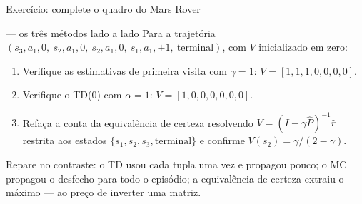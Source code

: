 \documentclass[aspectratio=169, 11pt]{beamer}
\begin{document}
\begin{frame}{Exercício: complete o quadro do Mars Rover}
  \begin{exbox}{— os três métodos lado a lado}
    Para a trajetória
    $(s_3, a_1, 0,\ s_2, a_1, 0,\ s_2, a_1, 0,\ s_1, a_1, +1,\ \text{terminal})$,
    com $V$ inicializado em zero:
    \begin{enumerate}\setlength{\itemsep}{0.15ex}
      \item Verifique as estimativas de primeira visita com $\gamma = 1$:
        $V = [1, 1, 1, 0, 0, 0, 0]$.
      \item Verifique o TD(0) com $\alpha = 1$:
        $V = [1, 0, 0, 0, 0, 0, 0]$.
      \item Refaça a conta da equivalência de certeza resolvendo
        $V = (I - \gamma \hat{P})^{-1} \hat{r}$ restrita aos estados
        $\{s_1, s_2, s_3, \text{terminal}\}$ e confirme
        $V(s_2) = \gamma/(2-\gamma)$.
    \end{enumerate}
  \end{exbox}

  \begin{ideiabox}
    Repare no contraste: o TD usou cada tupla uma vez e propagou pouco;
    o MC propagou o desfecho para todo o episódio; a equivalência de
    certeza extraiu o máximo — ao preço de inverter uma matriz.
  \end{ideiabox}
\end{frame}
\end{document}
